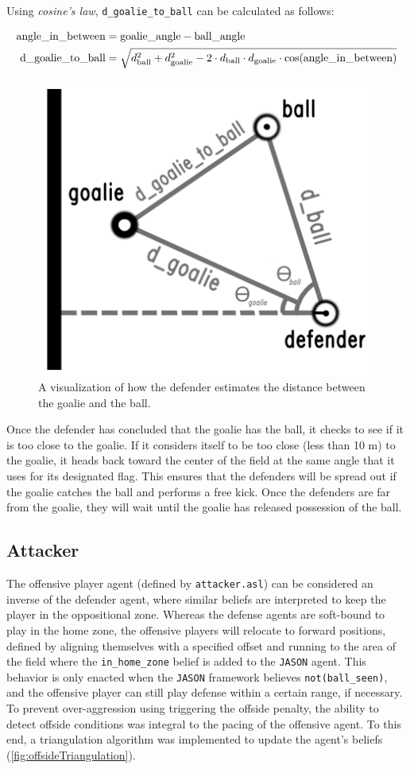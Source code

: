 \documentclass[conference]{IEEEtran}
\begin{document}
Using \textit{cosine's law}, \texttt{d\_goalie\_to\_ball} can be calculated as follows:

\[
\resizebox{\columnwidth}{!}{$
\begin{aligned}
    \text{angle\_in\_between} &= \text{goalie\_angle} - \text{ball\_angle} \\
    \text{d\_goalie\_to\_ball} &= 
    \sqrt{d_{\text{ball}}^2 + d_{\text{goalie}}^2 - 2 \cdot d_{\text{ball}} \cdot d_{\text{goalie}} \cdot \cos(\text{angle\_in\_between})}
\end{aligned}
$}
\]

\begin{figure}[ht!]
    \centering\centerline{\includegraphics[width=.25\textwidth]{Figures/triangulation_defender_goalie.png}}
    \caption{A visualization of how the defender estimates the distance between the goalie and the ball.}
    \label{fig:estimateGoalieDistance}
\end{figure}

Once the defender has concluded that the goalie has the ball, it checks to see if it is too close to the goalie. If it considers itself to be too close (less than 10 m) to the goalie, it heads back toward the center of the field at the same angle that it uses for its designated flag. This ensures that the defenders will be spread out if the goalie catches the ball and performs a free kick. Once the defenders are far from the goalie, they will wait until the goalie has released possession of the ball.

\subsection{Attacker}\label{AA}
The offensive player agent (defined by \texttt{attacker.asl}) can be considered an inverse of the defender agent, where similar beliefs are interpreted to keep the player in the oppositional zone. Whereas the defense agents are soft-bound to play in the home zone, the offensive players will relocate to forward positions, defined by aligning themselves with a specified offset and running to the area of the field where the \texttt{in\_home\_zone} belief is added to the \texttt{JASON} agent. This behavior is only enacted when the \texttt{JASON} framework believes \texttt{not(ball\_seen)}, and the offensive player can still play defense within a certain range, if necessary. To prevent over-aggression using triggering the offside penalty, the ability to detect offside conditions was integral to the pacing of the offensive agent. To this end, a triangulation algorithm was implemented to update the agent's beliefs (\ref{fig:offsideTriangulation}).
\end{document}
